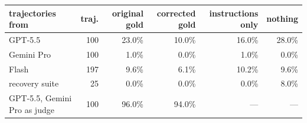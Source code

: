 \begin{tabular}{lrrrrr}
\toprule
trajectories from & traj. & original gold & corrected gold & instructions only & nothing \\
\midrule
GPT-5.5 & 100 & 23.0\% & 10.0\% & 16.0\% & 28.0\% \\
Gemini Pro & 100 & 1.0\% & 0.0\% & 1.0\% & 0.0\% \\
Flash & 197 & 9.6\% & 6.1\% & 10.2\% & 9.6\% \\
recovery suite & 25 & 0.0\% & 0.0\% & 0.0\% & 8.0\% \\
\midrule
GPT-5.5, Gemini Pro as judge & 100 & 96.0\% & 94.0\% & --- & --- \\
\bottomrule
\end{tabular}
